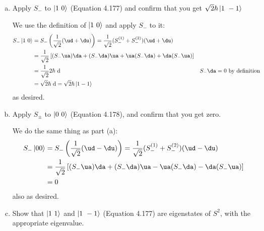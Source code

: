 \documentclass[10pt]{article}
\begin{document}
    \begin{enumerate}[(a)]
        \item Apply $S_-$ to $\ket{1 \ 0}$ (Equation 4.177) and confirm that you get $\sqrt2 \hbar \ket{1 \ -1}$
        
        \begin{solution}
            We use the definition of $\ket{1 \ 0}$ and apply $S_-$ to it:
                \begin{align*}
                    S_{-}\ket{1 \ 0} &= S_{-}\left(\frac{1}{\sqrt2}(\ud + \du)\right) = \frac{1}{\sqrt2}(S_{-}^{(1)} + S_{-}^{(2)})(\ud + \du)\\
                    &= \frac{1}{\sqrt2}\left[(S_{-}\ua)\da + (S_{-}\da)\ua + \ua(S_{-}\da) + \da(S_{-}\ua)\right]\\
                    &= \frac{1}{\sqrt2}2\hbar\dd && S_- \da = 0 \text{ by definition}\\
                    &= \sqrt{2}\hbar\dd = \sqrt2\hbar\ket{1 -1}
                \end{align*}
                as desired.
        \end{solution}
        \item Apply $S_\pm$ to $\ket{0 \ 0}$ (Equation 4.178), and confirm that you get zero. 
        
        \begin{solution}
            We do the same thing as part (a):
                \begin{align*}
                    S_{-}\ket{0 0} &= S_{-}\left(\frac{1}{\sqrt2}(\ud - \du)\right) = \frac{1}{\sqrt2}(S_{-}^{(1)} + S_{-}^{(2)})(\ud - \du)\\
                    &= \frac{1}{\sqrt2}\left[(S_{-}\ua)\da + (S_{-}\da)\ua - \ua(S_{-}\da) - \da(S_{-}\ua)\right]\\
                    &= 0
                \end{align*}
                also as desired.
        \end{solution}
        \item Show that $\ket{1 \ 1}$ and $\ket{1 \ -1}$ (Equation 4.177) are eigenstates of $S^2$, with the appropriate eigenvalue.
        

\end{enumerate}
\end{document}

